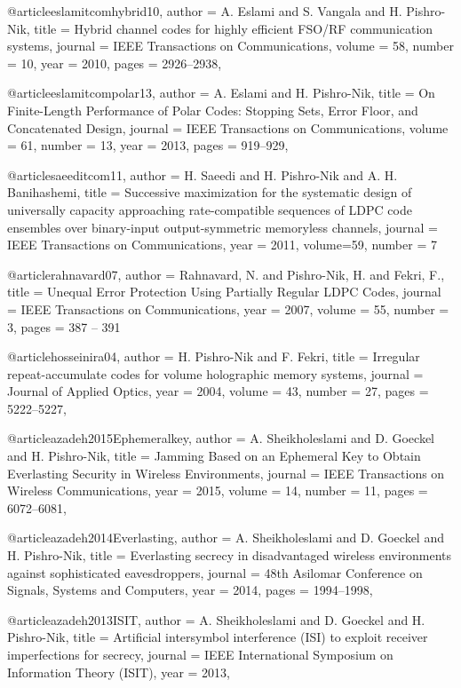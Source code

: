 {{{{{{@article{eslamitcomhybrid10,
	author = {A. Eslami and S. Vangala and H. Pishro-Nik},
	title = {Hybrid channel codes for highly efficient FSO/RF communication systems},
	journal = {IEEE Transactions on Communications},
	volume = {58},
	number = {10},
	year = {2010},
	pages = {2926--2938},
}


@article{eslamitcompolar13,
	author = {A. Eslami and H. Pishro-Nik},
	title = {On Finite-Length Performance of Polar Codes: Stopping Sets, Error Floor, and Concatenated Design},
	journal = {IEEE Transactions on Communications},
	volume = {61},
	number = {13},
	year = {2013},
	pages = {919--929},
}



@article{saeeditcom11,
	author = {H. Saeedi and H. Pishro-Nik and  A. H. Banihashemi},
	title = {Successive maximization for the systematic design of universally capacity approaching rate-compatible
	sequences of LDPC code ensembles over binary-input output-symmetric memoryless channels},
	journal = {IEEE Transactions on Communications},
	year = {2011},
	volume={59},
	number = {7}
}


@article{rahnavard07,
	author = {Rahnavard, N. and Pishro-Nik, H. and Fekri, F.},
	title = {Unequal Error Protection Using Partially Regular LDPC Codes},
	journal = {IEEE Transactions on Communications},
	year = {2007},
	volume = {55},
	number = {3},
	pages = {387 -- 391}
}


@article{hosseinira04,
	author = {H. Pishro-Nik and F. Fekri},
	title = {Irregular repeat-accumulate codes for volume holographic memory systems},
	journal = {Journal of Applied Optics},
	year = {2004},
	volume = {43},
	number = {27},
	pages = {5222--5227},
}


@article{azadeh2015Ephemeralkey,
	author = {A. Sheikholeslami and D. Goeckel and H. Pishro-Nik},
	title = {Jamming Based on an Ephemeral Key to Obtain Everlasting Security in Wireless Environments},
	journal = {IEEE Transactions on Wireless Communications},
	year = {2015},
	volume = {14},
	number = {11},
	pages = {6072--6081},
}


@article{azadeh2014Everlasting,
	author = {A. Sheikholeslami and D. Goeckel and H. Pishro-Nik},
	title = {Everlasting secrecy in disadvantaged wireless environments against sophisticated eavesdroppers},
	journal = {48th Asilomar Conference on Signals, Systems and Computers},
	year = {2014},
	pages = {1994--1998},
}


@article{azadeh2013ISIT,
	author = {A. Sheikholeslami and D. Goeckel and H. Pishro-Nik},
	title = {Artificial intersymbol interference (ISI) to exploit receiver imperfections for secrecy},
	journal = {IEEE International Symposium on Information Theory (ISIT)},
	year = {2013},
}


}}}}}}
